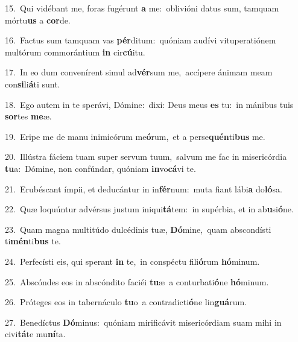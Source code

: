 {\numbfont\textcolor{\numbcolor}{15.}}~Qui vidébant me, foras fugérunt \textbf{a} me:~\star oblivióni datus sum, tamquam mórtu\textbf{us} a \textbf{cor}\-de.\par
{\numbfont\textcolor{\numbcolor}{16.}}~Factus sum tamquam vas \textbf{pér}\-ditum:~\star quóniam audívi vituperatiónem multórum commorántium \textbf{in} cir\-\textbf{cú}\-itu.\par
{\numbfont\textcolor{\numbcolor}{17.}}~In eo dum convenírent simul ad\-\textbf{vér}\-sum me,~\star accípere ánimam meam con\-\textbf{si}\-li\-\textbf{á}\-ti sunt.\par
{\numbfont\textcolor{\numbcolor}{18.}}~Ego autem in te sperávi, Dómine:~\dagger dixi: Deus meus \textbf{es} tu:~\star in mánibus tuis \textbf{sor}\-tes \textbf{me}\-æ.\par
{\numbfont\textcolor{\numbcolor}{19.}}~Eripe me de manu inimicórum me\-\textbf{ó}\-rum,~\star et a perse\-\textbf{quén}\-ti\textbf{bus} me.\par
{\numbfont\textcolor{\numbcolor}{20.}}~Illústra fáciem tuam super servum tuum,~\dagger salvum me fac in misericórdia \textbf{tu}\-a:~\star Dómine, non confúndar, quóniam \textbf{in}\-vo\-\textbf{cá}\-vi te.\par
{\numbfont\textcolor{\numbcolor}{21.}}~Erubéscant ímpii, et deducántur in in\-\textbf{fér}\-num:~\star muta fiant lábi\textbf{a} do\-\textbf{ló}\-sa.\par
{\numbfont\textcolor{\numbcolor}{22.}}~Quæ loquúntur advérsus justum iniqui\-\textbf{tá}\-tem:~\star in supérbia, et in ab\-\textbf{u}\-si\-\textbf{ó}\-ne.\par
{\numbfont\textcolor{\numbcolor}{23.}}~Quam magna multitúdo dulcédinis tuæ, \textbf{Dó}\-mine,~\star quam abscondísti ti\-\textbf{mén}\-ti\textbf{bus} te.\par
{\numbfont\textcolor{\numbcolor}{24.}}~Perfecísti eis, qui sperant \textbf{in} te,~\star in conspéctu fili\-\textbf{ó}\-rum \textbf{hó}\-minum.\par
{\numbfont\textcolor{\numbcolor}{25.}}~Abscóndes eos in abscóndito faciéi \textbf{tu}\-æ~\star a conturbati\-\textbf{ó}\-ne \textbf{hó}\-minum.\par
{\numbfont\textcolor{\numbcolor}{26.}}~Próteges eos in tabernáculo \textbf{tu}\-o~\star a contradicti\-\textbf{ó}\-ne lin\-\textbf{guá}\-rum.\par
{\numbfont\textcolor{\numbcolor}{27.}}~Benedíctus \textbf{Dó}\-minus:~\star quóniam mirificávit misericórdiam suam mihi in civi\-\textbf{tá}\-te mu\-\textbf{ní}\-ta.\par
